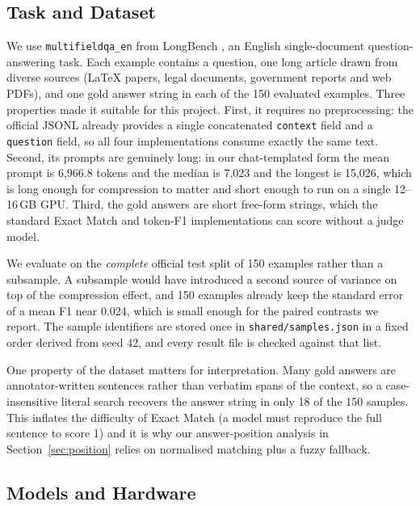 \documentclass[10pt,a4paper,twocolumn]{article}
\begin{document}
\subsection{Task and Dataset}

We use \texttt{multifieldqa\_en} from LongBench \citep{bai-etal-2024-longbench},
an English single-document question-answering task. Each example contains a question, one long article drawn from diverse sources (LaTeX papers, legal documents, government reports and web PDFs), and one gold answer string in each of the 150 evaluated examples. Three properties made it suitable for this project. First, it
requires no preprocessing: the official JSONL already provides a single
concatenated \texttt{context} field and a \texttt{question} field, so all four
implementations consume exactly the same text. Second, its prompts are genuinely
long: in our chat-templated form the mean prompt is 6{,}966.8 tokens and the
median is 7{,}023 and the longest is 15{,}026, which is long enough for compression to matter and short
enough to run on a single 12--16\,GB GPU. Third, the gold answers are short
free-form strings, which the standard Exact Match and token-F1 implementations can
score without a judge model.

We evaluate on the \emph{complete} official test split of 150 examples rather than
a subsample. A subsample would have introduced a second source of variance on top
of the compression effect, and 150 examples already keep the standard error of a
mean F1 near 0.024, which is small enough for the paired contrasts we report. The
sample identifiers are stored once in \texttt{shared/samples.json} in a fixed
order derived from seed 42, and every result file is checked against that list.

One property of the dataset matters for interpretation. Many gold answers are
annotator-written sentences rather than verbatim spans of the context, so a
case-insensitive literal search recovers the answer string in only 18 of the 150 samples. This
inflates the difficulty of Exact Match (a model must reproduce the full sentence
to score 1) and it is why our answer-position analysis in
Section~\ref{sec:position} relies on normalised matching plus a fuzzy fallback.

\subsection{Models and Hardware}
\end{document}
